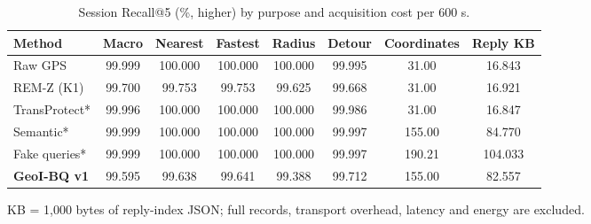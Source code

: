 \begin{table}[t]\centering\footnotesize
\caption{Session Recall@5 (\%, higher) by purpose and acquisition cost per 600 s.}\label{tab:service}
\begin{tabularx}{\linewidth}{@{}P{2.7cm}CCCCCCC@{}}\toprule
\textbf{Method} & \textbf{Macro} & \textbf{Nearest} & \textbf{Fastest} & \textbf{Radius} & \textbf{Detour} & \textbf{Coordinates} & \textbf{Reply KB} \\
\midrule
Raw GPS & 99.999 & 100.000 & 100.000 & 100.000 & 99.995 & 31.00 & 16.843 \\
REM-Z (K1) & 99.700 & 99.753 & 99.753 & 99.625 & 99.668 & 31.00 & 16.921 \\
TransProtect* & 99.996 & 100.000 & 100.000 & 100.000 & 99.986 & 31.00 & 16.847 \\
Semantic* & 99.999 & 100.000 & 100.000 & 100.000 & 99.997 & 155.00 & 84.770 \\
Fake queries* & 99.999 & 100.000 & 100.000 & 100.000 & 99.997 & 190.21 & 104.033 \\
\textbf{GeoI-BQ v1} & 99.595 & 99.638 & 99.641 & 99.388 & 99.712 & 155.00 & 82.557 \\
\bottomrule\end{tabularx}
\par\smallskip\raggedright KB = 1,000 bytes of reply-index JSON; full records, transport overhead, latency and energy are excluded.
\end{table}
